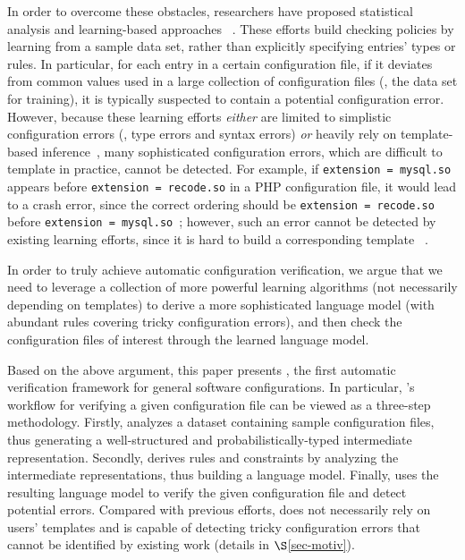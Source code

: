 In order to overcome these obstacles,
researchers have proposed 
statistical analysis and learning-based approaches%
~\cite{wang04automatic, zhang14encore, yuan11context}. 
These efforts build checking policies by learning from a sample 
data set, rather than explicitly specifying entries' types or rules.
In particular, for each entry in a certain configuration file, 
if it deviates from common values used in a large collection
of configuration files (\ie, the data set for training), it is typically
suspected to contain a potential configuration error.
However, because these learning 
efforts {\em either} are limited to simplistic 
configuration errors (\eg, type errors and syntax errors)
{\em or} heavily rely on template-based inference~\cite{zhang14encore}, 
many sophisticated configuration errors, 
which are difficult to template in practice, cannot be detected.
For example, if {\tt extension = mysql.so} appears 
before {\tt extension = recode.so} in a PHP configuration file,  
it would lead to a crash error, since the correct ordering 
should be {\tt extension = recode.so} before 
{\tt extension = mysql.so}~\cite{yin11anempirical};
however, such an error cannot be detected by existing
learning efforts, since it is hard to build a corresponding template ~\cite{xu15systems}.


In order to truly achieve automatic configuration verification,
we argue that we need to leverage a collection of more powerful learning 
algorithms (not necessarily depending on templates) to derive 
a more sophisticated language model (with abundant rules covering
tricky configuration errors), and then check the configuration files
of interest through the learned language model. 

Based on the above argument, 
this paper presents \app, the first automatic verification framework
for general software configurations.
In particular, \app's workflow for verifying a given configuration file
can be viewed as a three-step methodology.
Firstly, \app analyzes a dataset containing sample configuration files,
thus generating a well-structured and probabilistically-typed 
intermediate representation.
Secondly, \app derives rules and constraints by analyzing
the intermediate representations, thus building a language model.
Finally, \app uses the resulting language model
to verify the given configuration file and detect potential errors.
Compared with previous efforts,
\app does not necessarily rely on users' templates 
and is capable of detecting tricky configuration errors that
cannot be identified by existing work (details in $\S$\ref{sec-motiv}). 

